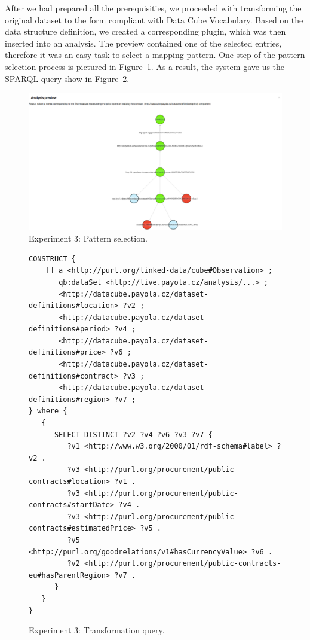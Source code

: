 After we had prepared all the prerequisities, we proceeded with transforming the 
original dataset to the form compliant with Data Cube Vocabulary. Based on the 
data structure definition, we created a corresponding plugin, which was then 
inserted into an analysis. The preview contained one of the selected entries, 
therefore it was an easy task to select a mapping pattern. One step of the 
pattern selection process is pictured in Figure~\ref{fig:contracts-pattern}.
As a result, the system gave us the SPARQL query show in 
Figure~\ref{fig:contracts-query-pattern}.

\begin{figure}
  \centering
  \includegraphics[width=140mm]{img/contracts-pattern.png}
  \caption{Experiment 3: Pattern selection.}
  \label{fig:contracts-pattern}
\end{figure}

\begin{figure}
  \scriptsize
  \begin{verbatim}
CONSTRUCT {
    [] a <http://purl.org/linked-data/cube#Observation> ;
       qb:dataSet <http://live.payola.cz/analysis/...> ;
       <http://datacube.payola.cz/dataset-definitions#location> ?v2 ;
       <http://datacube.payola.cz/dataset-definitions#period> ?v4 ;
       <http://datacube.payola.cz/dataset-definitions#price> ?v6 ;
       <http://datacube.payola.cz/dataset-definitions#contract> ?v3 ;
       <http://datacube.payola.cz/dataset-definitions#region> ?v7 ;
} where {
   {
      SELECT DISTINCT ?v2 ?v4 ?v6 ?v3 ?v7 {
         ?v1 <http://www.w3.org/2000/01/rdf-schema#label> ?v2 .
         ?v3 <http://purl.org/procurement/public-contracts#location> ?v1 .
         ?v3 <http://purl.org/procurement/public-contracts#startDate> ?v4 .
         ?v3 <http://purl.org/procurement/public-contracts#estimatedPrice> ?v5 .
         ?v5 <http://purl.org/goodrelations/v1#hasCurrencyValue> ?v6 .
         ?v2 <http://purl.org/procurement/public-contracts-eu#hasParentRegion> ?v7 .
      }
   }
} 
  \end{verbatim}
  \caption{Experiment 3: Transformation query.}
  \label{fig:contracts-query-pattern}
\end{figure}

